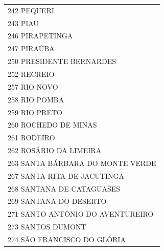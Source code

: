 \documentclass{article}
\begin{document}
\begin{longtable}[c]{m{18cm}}
\multicolumn{1}{l}{ \hspace{2em} 242 PEQUERI } \\
\multicolumn{1}{l}{ \hspace{2em} 243 PIAU } \\
\multicolumn{1}{l}{ \hspace{2em} 246 PIRAPETINGA } \\
\multicolumn{1}{l}{ \hspace{2em} 247 PIRAÚBA } \\
\multicolumn{1}{l}{ \hspace{2em} 250 PRESIDENTE BERNARDES } \\
\multicolumn{1}{l}{ \hspace{2em} 252 RECREIO } \\
\multicolumn{1}{l}{ \hspace{2em} 257 RIO NOVO } \\
\multicolumn{1}{l}{ \hspace{2em} 258 RIO POMBA } \\
\multicolumn{1}{l}{ \hspace{2em} 259 RIO PRETO } \\
\multicolumn{1}{l}{ \hspace{2em} 260 ROCHEDO DE MINAS } \\
\multicolumn{1}{l}{ \hspace{2em} 261 RODEIRO } \\
\multicolumn{1}{l}{ \hspace{2em} 262 ROSÁRIO DA LIMEIRA } \\
\multicolumn{1}{l}{ \hspace{2em} 263 SANTA BÁRBARA DO MONTE VERDE } \\
\multicolumn{1}{l}{ \hspace{2em} 267 SANTA RITA DE JACUTINGA } \\
\multicolumn{1}{l}{ \hspace{2em} 268 SANTANA DE CATAGUASES } \\
\multicolumn{1}{l}{ \hspace{2em} 269 SANTANA DO DESERTO } \\
\multicolumn{1}{l}{ \hspace{2em} 271 SANTO ANTÔNIO DO AVENTUREIRO } \\
\multicolumn{1}{l}{ \hspace{2em} 273 SANTOS DUMONT } \\
\multicolumn{1}{l}{ \hspace{2em} 274 SÃO FRANCISCO DO GLÓRIA } \\

\end{longtable}
\end{document}
